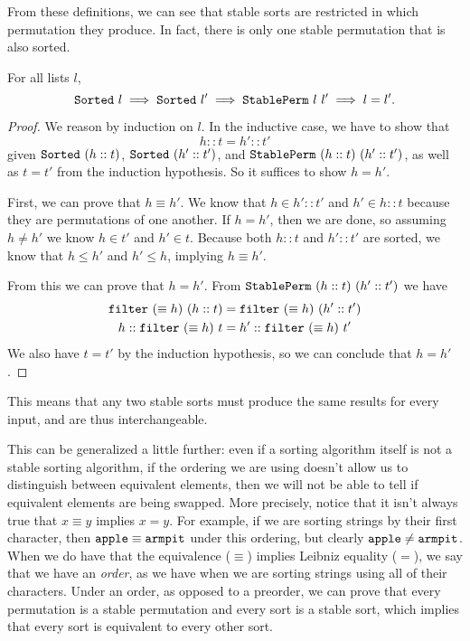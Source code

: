 \documentclass[sigplan,10pt,anonymous,review]{thesis}
\begin{document}
From these definitions, we can see that stable sorts are restricted in
which permutation they produce. In fact, there is only one stable
permutation that is also sorted.
\begin{theorem}
  For all lists $l$,
  \begin{equation*}
    \texttt{\textup{Sorted}}~l \implies \texttt{\textup{Sorted}}~l' \implies
    \texttt{\textup{StablePerm}}~l~l' \implies l = l'.
  \end{equation*}
\end{theorem}
\begin{proof}
  We reason by induction on $l$. In the inductive case, we have to
  show that
  \begin{equation*}
    h :: t = h' :: t'
  \end{equation*}
  given $\texttt{\textup{Sorted}}~(h :: t)$, $\texttt{\textup{Sorted}}~(h' :: t')$, and
  $\texttt{\textup{StablePerm}}~(h :: t)~(h' :: t')$, as well as $t = t'$ from the
  induction hypothesis. So it suffices to show $h = h'$.

  First, we can prove that $h \equiv h'$. We know that $h \in h' :: t'$ and
  $h' \in h :: t$ because they are permutations of one another. If $h =
  h'$, then we are done, so assuming $h \neq h'$ we know $h \in t'$ and $h'
  \in t$. Because both $h::t$ and $h'::t'$ are sorted, we know that $h \le
  h'$ and $h' \le h$, implying $h \equiv h'$.

  From this we can prove that $h = h'$. From $\texttt{\textup{StablePerm}}~(h ::
  t)~(h' :: t')$ we have
  \begin{align*}
    \texttt{\textup{filter}}~(\equiv h)~(h :: t) &= \texttt{\textup{filter}}~(\equiv h)~(h' :: t') \\
    h :: \texttt{\textup{filter}}~(\equiv h)~t &= h' :: \texttt{\textup{filter}}~(\equiv h)~t'
  \end{align*}
  We also have $t = t'$ by the induction hypothesis, so we can
  conclude that $h = h'$.
\end{proof}

This means that any two stable sorts must produce the same results for
every input, and are thus interchangeable.
\stablesortunique*

This can be generalized a little further: even if a sorting algorithm
itself is not a stable sorting algorithm, if the ordering we are using
doesn't allow us to distinguish between equivalent elements, then we
will not be able to tell if equivalent elements are being swapped.
More precisely, notice that it isn't always true that $x \equiv y$ implies
$x = y$. For example, if we are sorting strings by their first
character, then $\text{\texttt{apple}} \equiv \text{\texttt{armpit}}$ under
this ordering, but clearly $\text{\texttt{apple}} \neq
\text{\texttt{armpit}}$. When we do have that the equivalence ($\equiv$)
implies Leibniz equality ($=$), we say that we have an \textit{order},
as we have when we are sorting strings using all of their characters.
Under an order, as opposed to a preorder, we can prove that every
permutation is a stable permutation and every sort is a stable sort,
which implies that every sort is equivalent to every other sort.
\end{document}
